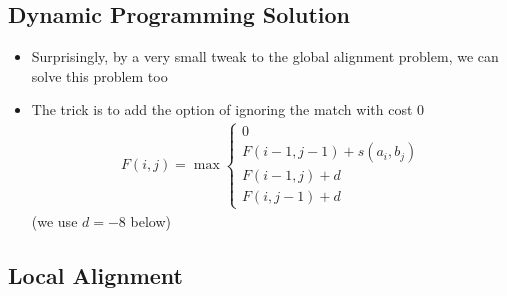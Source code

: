 
\begin{slide}
\section{Dynamic Programming Solution}

\begin{PauseHighLight}
  \begin{itemize}
  \item Surprisingly, by a very small tweak to the global alignment
    problem, we can solve this problem too\pause
  \item The trick is to add the option of ignoring the match with cost
    0\pause
    \begin{align*}
      F(i,j) = \max \left\{
      \begin{matrix}
        0 \\
        F(i-1,j-1) + s(a_i, b_j)\\
        F(i-1,j) + d\\
        F(i,j-1) + d
      \end{matrix}\right.
    \end{align*}
    (we use $d=-8$ below)\pause
  \end{itemize}
\end{PauseHighLight}


\end{slide}


\begin{slide}
\section[-2]{Local Alignment}
\pause
\pb
{}
\begin{center}
  \pause
\end{center}
\end{slide}


